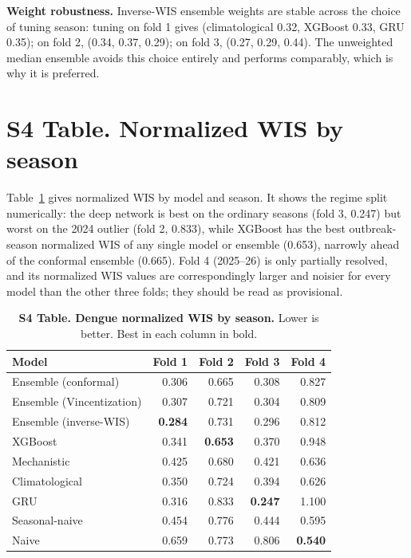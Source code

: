 \documentclass[11pt]{article}
\begin{document}
\noindent\textbf{Weight robustness.} Inverse-WIS ensemble weights are stable across the choice of
tuning season: tuning on fold 1 gives (climatological 0.32, XGBoost 0.33, GRU 0.35); on fold 2,
(0.34, 0.37, 0.29); on fold 3, (0.27, 0.29, 0.44). The unweighted median ensemble avoids this choice
entirely and performs comparably, which is why it is preferred.

\section*{S4 Table. Normalized WIS by season}
Table~\ref{tab:nwisfold} gives normalized WIS by model and season. It shows the regime split
numerically: the deep network is best on the ordinary seasons (fold 3, 0.247) but worst on the 2024
outlier (fold 2, 0.833), while XGBoost has the best outbreak-season normalized WIS of any single
model or ensemble (0.653), narrowly ahead of the conformal ensemble (0.665). Fold 4 (2025--26) is
only partially resolved, and its normalized WIS values are correspondingly larger and noisier for
every model than the other three folds; they should be read as provisional.

\begin{table}[t]
\centering\small
\caption{\textbf{S4 Table. Dengue normalized WIS by season.} Lower is better. Best in each column in bold.}
\label{tab:nwisfold}
\begin{tabular}{@{}lrrrr@{}}
\toprule
\textbf{Model} & \textbf{Fold 1} & \textbf{Fold 2} & \textbf{Fold 3} & \textbf{Fold 4} \\
\midrule
Ensemble (conformal)      & 0.306 & 0.665 & 0.308 & 0.827 \\
Ensemble (Vincentization) & 0.307 & 0.721 & 0.304 & 0.809 \\
Ensemble (inverse-WIS)    & \textbf{0.284} & 0.731 & 0.296 & 0.812 \\
XGBoost                   & 0.341 & \textbf{0.653} & 0.370 & 0.948 \\
Mechanistic               & 0.425 & 0.680 & 0.421 & 0.636 \\
Climatological            & 0.350 & 0.724 & 0.394 & 0.626 \\
GRU                       & 0.316 & 0.833 & \textbf{0.247} & 1.100 \\
Seasonal-naive            & 0.454 & 0.776 & 0.444 & 0.595 \\
Naive                     & 0.659 & 0.773 & 0.806 & \textbf{0.540} \\
\bottomrule
\end{tabular}
\end{table}
\end{document}
